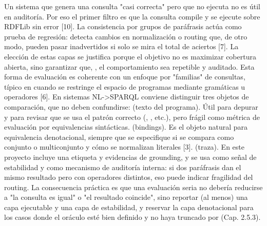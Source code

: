 \markdownRendererUlItem {} Un sistema que genera una consulta "casi correcta" pero que no ejecuta no es útil en auditoría. Por eso el primer filtro es que la consulta compile y se ejecute sobre RDFLib sin error [10].\markdownRendererUlItemEnd 
\markdownRendererUlItem {} La consistencia por grupos de paráfrasis actúa como prueba de regresión: detecta cambios en normalización o routing que, de otro modo, pueden pasar inadvertidos si solo se mira el total de aciertos [7].\markdownRendererUlItemEnd 
\markdownRendererUlEndTight \markdownRendererInterblockSeparator
{}La elección de estas capas se justifica porque el objetivo no es maximizar cobertura abierta, sino garantizar que, , el comportamiento sea repetible y auditado. Esta forma de evaluación es coherente con un enfoque por "familias" de consultas, típico en  cuando se restringe el espacio de programas mediante gramáticas u operadores [6].\markdownRendererInterblockSeparator
{}\markdownRendererInterblockSeparator
{}En sistemas NL->SPARQL conviene distinguir tres objetos de comparación, que no deben confundirse:\markdownRendererInterblockSeparator
{}\markdownRendererUlBeginTight
\markdownRendererUlItem {} (texto del programa). Útil para depurar y para revisar que se usa el patrón correcto (, , etc.), pero frágil como métrica de evaluación por equivalencias sintácticas.\markdownRendererUlItemEnd 
\markdownRendererUlItem {} (bindings). Es el objeto natural para equivalencia denotacional, siempre que se especifique si se compara como conjunto o multiconjunto y cómo se normalizan literales [3].\markdownRendererUlItemEnd 
\markdownRendererUlItem {} (traza). En este proyecto incluye una etiqueta  y evidencias de grounding, y se usa como señal de estabilidad y como mecanismo de auditoría interna: si dos paráfrasis dan el mismo resultado pero con operadores distintos, eso puede indicar fragilidad del routing.\markdownRendererUlItemEnd 
\markdownRendererUlEndTight \markdownRendererInterblockSeparator
{}La consecuencia práctica es que una evaluación seria no debería reducirse a "la consulta es igual" o "el resultado coincide", sino reportar (al menos) una capa ejecutable y una capa de estabilidad, y reservar la capa denotacional para los casos donde el oráculo esté bien definido y no haya truncado por  (Cap. 2.5.3).\markdownRendererInterblockSeparator
